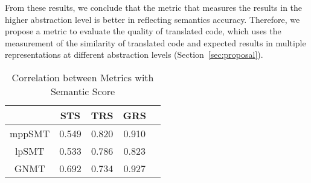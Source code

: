 From these results, we conclude that the metric that measures the
results in the higher abstraction level is better in reflecting
semantics accuracy. Therefore, we propose a metric to evaluate the
quality of translated code, which uses the measurement of the
similarity of translated code and expected results in multiple
representations at different abstraction levels
(Section~\ref{sec:proposal}).




\begin{table}
\centering
\caption{Correlation between Metrics with Semantic Score}
\begin{tabular}{|c|c|c|c|c|}
\hline
 & STS & TRS & GRS\\
\hline
mppSMT  & 0.549 & 0.820 & 0.910 \\
\hline
lpSMT  & 0.533 & 0.786 & 0.823 \\
\hline
GNMT & 0.692 & 0.734 & 0.927 \\
\hline
\end{tabular}
\label{table:correlation}
\end{table}


%

